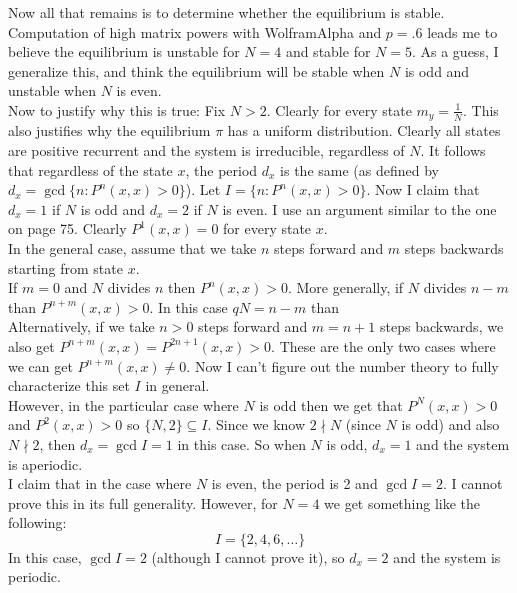 \documentclass[14pt,letterpaper]{extarticle}
\begin{document}
\begin{center}
\begin{enumerate}
    \vspace{3mm}
    Now all that remains is to determine whether the equilibrium is stable.
    Computation of high matrix powers with WolframAlpha and $p=.6$ leads me to believe the equilibrium is unstable for $N=4$ and stable for $N=5$. As a guess, I generalize this, and think the equilibrium will be stable when $N$ is odd and unstable when $N$ is even. \\
    \vspace{3mm}
    Now to justify why this is true: Fix $N>2$.
    Clearly for every state $m_y=\frac{1}{N}$. This also justifies why the equilibrium $\pi$ has a uniform distribution. Clearly all states are positive recurrent and the system is irreducible, regardless of $N$. It follows that regardless of the state $x$, the period $d_x$ is the same (as defined by $d_x=\gcd\{n:P^n(x,x)>0\}$). Let $I=\{n:P^n(x,x)>0\}$. 
     Now I claim that $d_x=1$ if $N$ is odd and $d_x=2$ if $N$ is even. I use an argument similar to the one on page 75. Clearly $P^1(x,x)=0$ for every state $x$. \\
    In the general case, assume that we take $n$ steps forward and $m$ steps backwards starting from state $x$.\\
    If $m=0$ and $N$ divides $n$ then $P^n(x,x)>0$. More generally, if $N$ divides $n-m$ than $P^{n+m}(x,x)>0$. In this case $qN=n-m$ than \\
    Alternatively, if we take $n>0$ steps forward and $m=n+1$ steps backwards, we also get $P^{n+m}(x,x)=P^{2n+1}(x,x)>0$. These are the only two cases where we can get $P^{n+m}(x,x)\ne 0$.  Now I can't figure out the number theory to fully characterize this set $I$ in general. \\
    However, in the particular case where $N$ is odd then we get that $P^N(x,x)>0$ and $P^{2}(x,x)>0$ so $\{N,2\}\subseteq I$. Since we know $2\nmid N$ (since $N$ is odd) and also $N\nmid 2$, then $d_x=\gcd I=1$ in this case. So when $N$ is odd, $d_x=1$ and the system is aperiodic. \\
    I claim that in the case where $N$ is even, the period is 2 and $\gcd I=2$. I cannot prove this in its full generality. However, for $N=4$ we get something like the following:
    \[ I=\{2,4,6,\dots\} \]
    In this case, $\gcd I=2$ (although I cannot prove it), so $d_x=2$ and the system is periodic. \\

\end{enumerate}
\end{center}
\end{document}
